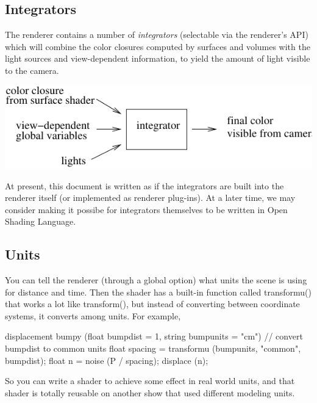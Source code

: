 \documentclass[11pt,letterpaper]{book}
\def\langname{Open Shading Language\xspace}
\begin{document}
\subsection*{Integrators}

The renderer contains a number of \emph{integrators} (selectable via the
renderer's API) which will combine the color closures computed by
surfaces and volumes with the light sources and view-dependent
information, to yield the amount of light visible to the camera.

\bigskip

\includegraphics{Figures/integratorschematic}

\medskip

\begin{annotate}
At present, this document is written as if the integrators are built
into the renderer itself (or implemented as renderer plug-ins).  At a
later time, we may consider making it possibe for integrators themselves
to be written in \langname.
\end{annotate}

\subsection*{Units}

You can tell the renderer (through a global option) what units the scene
is using for distance and time.  Then the shader has a built-in function
called {\cf transformu()} that works a lot like {\cf transform()}, but
instead of converting between coordinate systems, it converts among
units.  For example,

\begin{code}
    displacement bumpy (float bumpdist = 1,
                        string bumpunits = "cm")
    {
        // convert bumpdist to common units
        float spacing = transformu (bumpunits, "common", bumpdist);
        float n = noise (P / spacing);
        displace (n);
    }
\end{code}

So you can write a shader to achieve some effect in real world units,
and that shader is totally reusable on another show that used different
modeling units.
\end{document}
